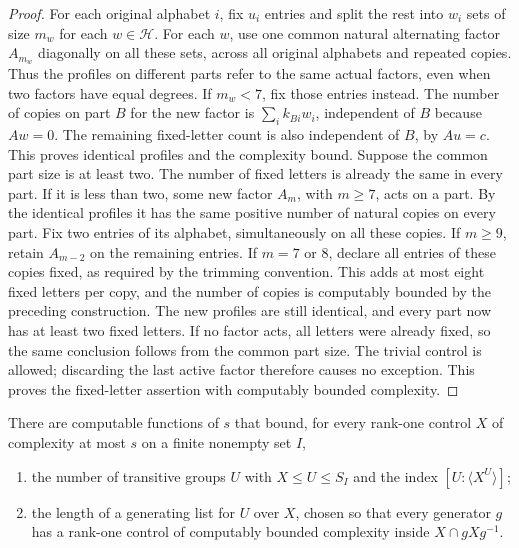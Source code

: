 \begin{proof}
For each original alphabet $i$, fix $u_i$ entries and split the rest
into $w_i$ sets of size $m_w$ for each $w\in\mathcal H$.
For each $w$, use one common natural alternating factor $A_{m_w}$
diagonally on all these sets, across all original alphabets and repeated
copies.  Thus the profiles on different parts refer to the same actual
factors, even when two factors have equal degrees.  If $m_w<7$, fix
those entries instead.  The number of copies on part $B$ for the new factor
is $\sum_i k_{Bi}w_i$, independent of $B$ because $Aw=0$.
The remaining fixed-letter count is also independent of $B$, by
$Au=c$.  This proves identical profiles and the complexity bound.
Suppose the common part size is at least two.  The number of fixed
letters is already the same in every part.  If it is less than two,
some new factor $A_m$, with $m\ge7$, acts on a part.  By the identical
profiles it has the same positive number of natural copies on every
part.  Fix two entries of its alphabet, simultaneously on all these
copies.  If $m\ge9$, retain $A_{m-2}$ on the remaining entries.  If
$m=7$ or $8$, declare all entries of these copies fixed, as required
by the trimming convention.  This adds at most eight fixed letters
per copy, and the number of copies is computably bounded by the
preceding construction.  The new profiles are still identical, and
every part now has at least two fixed letters.  If no factor acts,
all letters were already fixed, so the same conclusion follows from
the common part size.  The trivial control is allowed; discarding
the last active factor therefore causes no exception.  This proves
the fixed-letter assertion with computably bounded complexity.
\end{proof}

\begin{proposition}\label{n:rank-one}
There are computable functions of $s$ that bound, for every rank-one
control $X$ of complexity at most $s$ on a finite nonempty set $I$,
\begin{enumerate}[label=\textup{(\roman*)}]
\item the number of transitive groups $U$ with $X\le U\le S_I$ and
      the index $[U:\langle X^U\rangle]$;
\item the length of a generating list for $U$ over $X$, chosen so
      that every generator $g$ has a rank-one control of computably
      bounded complexity inside $X\cap gXg^{-1}$.
\end{enumerate}
\end{proposition}

